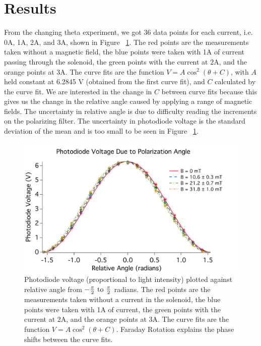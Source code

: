\documentclass[prb,preprint]{revtex4-1}
\begin{document}
\section{Results}

From the changing theta experiment, we got 36 data points for each current, i.e. 0A, 1A, 2A, and 3A, shown in Figure ~\ref{V_ThetaRel_Plot}. The red points are the measurements taken without a magnetic field, the blue points were taken with 1A of current passing through the solenoid, the green points with the current at 2A, and the orange points at 3A.  The curve fits are the function $V = A \cos^{2}(\theta + C)$, with $A$ held constant at 6.2845 V (obtained from the first curve fit), and $C$ calculated by the curve fit. We are interested in the change in $C$ between curve fits because this gives us the change in the relative angle caused by applying a range of magnetic fields. The uncertainty in relative angle is due to difficulty reading the increments on the polarizing filter. The uncertainty in photodiode voltage is the standard deviation of the mean and is too small to be seen in Figure ~\ref{V_ThetaRel_Plot}.

\begin{figure}[h!]
\centering

\includegraphics[width=6in]{V_ThetaRel_Plot.pdf}
\caption{Photodiode voltage (proportional to light intensity) plotted against relative angle from $-\frac{\pi}{2} \rm{\ to\ } \frac{\pi}{2}$ radians.  The red points are the measurements taken without a current in the solenoid, the blue points were taken with 1A of current, the green points with the current at 2A, and the orange points at 3A.  The curve fits are the function $V = A \cos^{2}(\theta + C) $. Faraday Rotation explains the phase shifts between the curve fits.}

\label{V_ThetaRel_Plot}
\end{figure}
\end{document}
